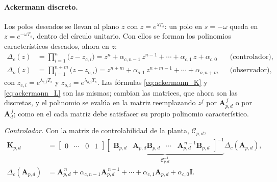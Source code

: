 \paragraph{Ackermann discreto.} Los polos deseados se llevan al plano $z$ con
$z = e^{\lambda T_s}$: un polo en $s = -\omega$ queda en $z = e^{-\omega T_s}$,
dentro del círculo unitario. Con ellos se forman los polinomios característicos
deseados, ahora en $z$:
\begin{equation}
\begin{aligned}
\Delta_c(z) &= \prod_{i=1}^{n} \bigl(z - z_{c,i}\bigr)
= z^{n} + \alpha_{c,n-1}\, z^{n-1} + \cdots + \alpha_{c,1}\, z + \alpha_{c,0}
&& \text{(controlador)}, \\[6pt]
\Delta_o(z) &= \prod_{i=1}^{n+m} \bigl(z - z_{o,i}\bigr)
= z^{n+m} + \alpha_{o,1}\, z^{n+m-1} + \cdots + \alpha_{o,n+m}
&& \text{(observador)},
\end{aligned}
\label{eq:disc_polinomios}
\end{equation}
con $z_{c,i} = e^{\lambda_{c,i} T_s}$ y $z_{o,i} = e^{\lambda_{o,i} T_s}$. Las fórmulas \eqref{eq:ackermann_K} y \eqref{eq:ackermann_L} son las mismas;
cambian las matrices, que ahora son las discretas, y el polinomio se evalúa en
la matriz reemplazando $z^j$ por $\mathbf{A}_{p,d}^{\,j}$ o por $\mathbf{A}_d^{\,j}$; como en el
 cada matriz debe satisfacer su propio polinomio
característico.

\textit{Controlador.} Con la matriz de controlabilidad de la planta,
$\mathcal{C}_{p,d}$,
\begin{equation}
\begin{aligned}
\mathbf{K}_{p,d} &=
\begin{bmatrix} 0 & \cdots & 0 & 1 \end{bmatrix}
\underbrace{\begin{bmatrix} \mathbf{B}_{p,d} & \mathbf{A}_{p,d}\mathbf{B}_{p,d} & \cdots & \mathbf{A}_{p,d}^{\,n-1}\mathbf{B}_{p,d} \end{bmatrix}^{-1}}_{\mathcal{C}_{p,d}^{-1}}
\Delta_c(\mathbf{A}_{p,d}),
\\
\Delta_c(\mathbf{A}_{p,d}) &= \mathbf{A}_{p,d}^{\,n} + \alpha_{c,n-1}\mathbf{A}_{p,d}^{\,n-1} + \cdots + \alpha_{c,1}\mathbf{A}_{p,d} + \alpha_{c,0}\mathbf{I} .
\end{aligned}
\label{eq:disc_ackermann}
\end{equation}

